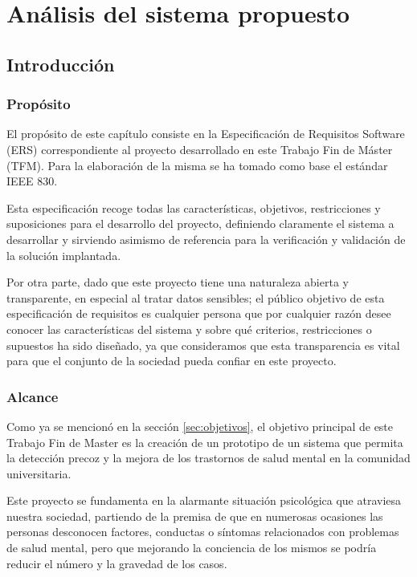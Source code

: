 \chapter{Análisis del sistema propuesto}
\label{chapter:analisis}


\section{Introducción}

    \subsection{Propósito}
        El propósito de este capítulo consiste en la Especificación de Requisitos Software (ERS) correspondiente al proyecto desarrollado en este Trabajo Fin de Máster (TFM). Para la elaboración de la misma se ha tomado como base el estándar IEEE 830.

        Esta especificación recoge todas las características, objetivos, restricciones y suposiciones para el desarrollo del proyecto, definiendo claramente el sistema a desarrollar y sirviendo asimismo de referencia para la verificación y validación de la solución implantada.

        Por otra parte, dado que este proyecto tiene una naturaleza abierta y transparente, en especial al tratar datos sensibles; el público objetivo de esta especificación de requisitos es cualquier persona que por cualquier razón desee conocer las características del sistema y sobre qué criterios, restricciones o supuestos ha sido diseñado, ya que consideramos que esta transparencia es vital para que el conjunto de la sociedad pueda confiar en este proyecto.
        
    \subsection{Alcance}
        Como ya se mencionó en la sección \ref{sec:objetivos}, el objetivo principal de este Trabajo Fin de Master es la creación de un prototipo de un sistema que permita la detección precoz y la mejora de los trastornos de salud mental en la comunidad universitaria. 

        Este proyecto se fundamenta en la alarmante situación psicológica que atraviesa nuestra sociedad, partiendo de la premisa de que en numerosas ocasiones las personas desconocen factores, conductas o síntomas relacionados con problemas de salud mental, pero que mejorando la conciencia de los mismos se podría reducir el número y la gravedad de los casos.

